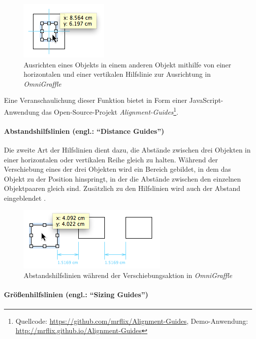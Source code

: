 \begin{figure}[hbt]
    \centering
    \includegraphics{assets/omnigraffle-alignment-guides-centering.png}
    \caption{Ausrichten eines Objekts in einem anderen Objekt mithilfe von einer horizontalen und einer vertikalen Hilfslinie zur Ausrichtung in \textit{OmniGraffle}}
    \label{fig:omnigraffle-alignment-guides-centering}
\end{figure}

Eine Veranschaulichung dieser Funktion bietet in Form einer JavaScript-Anwendung das Open-Source-Projekt \textit{Alignment-Guides}\footnote{Quellcode: \url{https://github.com/mrflix/Alignment-Guides}, Demo-Anwendung: \url{http://mrflix.github.io/Alignment-Guides}}.

\paragraph{Abstandshilfslinien (engl.: \enquote{Distance Guides})}

Die zweite Art der Hilfslinien dient dazu, die Abstände zwischen drei Objekten in einer horizontalen oder vertikalen Reihe gleich zu halten. Während der Verschiebung eines der drei Objekten wird ein Bereich gebildet, in dem das Objekt zu der Position hinspringt, in der die Abstände zwischen den einzelnen Objektpaaren gleich sind. Zusätzlich zu den Hilfslinien wird auch der Abstand eingeblendet \cite{11Keynote, Olsen10OmniGraffle}.

\begin{figure}[hbt]
    \centering
    \includegraphics{assets/omnigraffle-distance-guides.png}
    \caption{Abstandshilfslinien während der Verschiebungsaktion in \textit{OmniGraffle}}
    \label{fig:omnigraffle-distance-guides}
\end{figure}

\paragraph{Größenhilfslinien (engl.: \enquote{Sizing Guides})}

